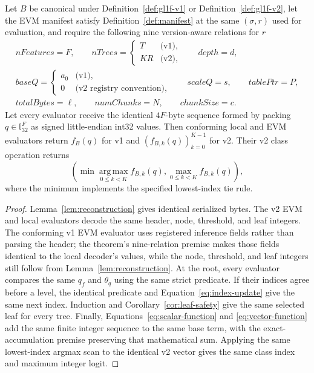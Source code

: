 \begin{theorem}
\label{thm:equivalence}
Let $B$ be canonical under Definition~\ref{def:gl1f-v1} or
Definition~\ref{def:gl1f-v2}, let the EVM manifest satisfy
Definition~\ref{def:manifest} at the same $(\sigma,r)$ used for evaluation, and
require the following nine version-aware relations for $r$
\[
\begin{gathered}
nFeatures=F,\qquad
nTrees=\begin{cases}T&\text{(v1)},\\KR&\text{(v2)},\end{cases}
\qquad depth=d,\\
baseQ=\begin{cases}a_0&\text{(v1)},\\0&\text{(v2 registry convention)},\end{cases}
\qquad scaleQ=s,\qquad tablePtr=P,\\
totalBytes=\ell,\qquad numChunks=N,\qquad chunkSize=c.
\end{gathered}
\]
Let every evaluator receive the identical $4F$-byte sequence formed by packing
$q\in\mathbb{I}_{32}^F$ as signed little-endian int32 values. Then conforming
local and EVM evaluators return $f_B(q)$ for v1 and
$(f_{B,k}(q))_{k=0}^{K-1}$ for v2. Their v2 class operation returns
\[
 \left(\min\operatorname*{arg\,max}_{0\le k<K} f_{B,k}(q),
       \max_{0\le k<K} f_{B,k}(q)\right),
\]
where the minimum implements the specified lowest-index tie rule.
\end{theorem}

\begin{proof}
Lemma~\ref{lem:reconstruction} gives identical serialized bytes.  The v2 EVM
and local evaluators decode the same header, node, threshold, and leaf integers.
The conforming v1 EVM evaluator uses registered inference fields rather than parsing
the header; the theorem's nine-relation premise makes those fields
identical to the local decoder's values, while the node, threshold, and leaf
integers still follow from Lemma~\ref{lem:reconstruction}.  At the root, every
evaluator compares the same $q_f$ and $\theta_q$ using the same strict
predicate.  If their indices agree before a level, the identical predicate and
Equation~\ref{eq:index-update} give the same next index.  Induction and
Corollary~\ref{cor:leaf-safety} give the same selected leaf for every tree.
Finally, Equations~\ref{eq:scalar-function} and
\ref{eq:vector-function} add the same finite integer sequence to the same base
term, with the exact-accumulation premise preserving that mathematical sum.
Applying the same lowest-index argmax scan to the identical v2 vector gives
the same class index and maximum integer logit.
\end{proof}

